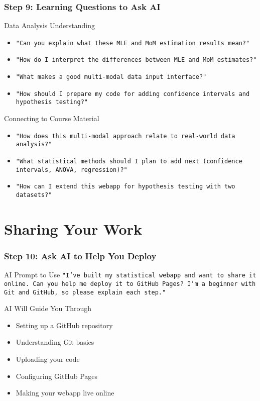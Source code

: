 \documentclass[aspectratio=169]{beamer}
\begin{document}
\begin{frame}
\frametitle{Step 9: Learning Questions to Ask AI}
\begin{exampleblock}{Data Analysis Understanding}
\begin{itemize}
\item \texttt{"Can you explain what these MLE and MoM estimation results mean?"}
\item \texttt{"How do I interpret the differences between MLE and MoM estimates?"}
\item \texttt{"What makes a good multi-modal data input interface?"}
\item \texttt{"How should I prepare my code for adding confidence intervals and hypothesis testing?"}
\end{itemize}
\end{exampleblock}

\begin{alertblock}{Connecting to Course Material}
\begin{itemize}
\item \texttt{"How does this multi-modal approach relate to real-world data analysis?"}
\item \texttt{"What statistical methods should I plan to add next (confidence intervals, ANOVA, regression)?"}
\item \texttt{"How can I extend this webapp for hypothesis testing with two datasets?"}
\end{itemize}
\end{alertblock}
\end{frame}

\section{Sharing Your Work}

\begin{frame}
\frametitle{Step 10: Ask AI to Help You Deploy}
\begin{alertblock}{AI Prompt to Use}
\texttt{"I've built my statistical webapp and want to share it online. Can you help me deploy it to GitHub Pages? I'm a beginner with Git and GitHub, so please explain each step."}
\end{alertblock}

\begin{exampleblock}{AI Will Guide You Through}
\begin{itemize}
\item Setting up a GitHub repository
\item Understanding Git basics
\item Uploading your code
\item Configuring GitHub Pages
\item Making your webapp live online
\end{itemize}
\end{exampleblock}
\end{frame}
\end{document}
